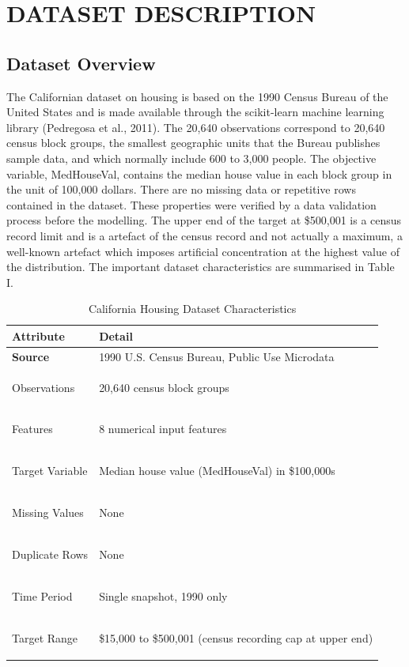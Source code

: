 \documentclass[pdflatex,sn-mathphys-num]{sn-jnl}
\begin{document}
\section{DATASET DESCRIPTION}
\subsection{Dataset Overview}
The Californian dataset on housing is based on the 1990 Census Bureau of the United States and is made available through the scikit-learn machine learning library (Pedregosa et al., 2011). The 20,640 observations correspond to 20,640 census block groups, the smallest geographic units that the Bureau publishes sample data, and which normally include 600 to 3,000 people. The objective variable, MedHouseVal, contains the median house value in each block group in the unit of 100,000 dollars. There are no missing data or repetitive rows contained in the dataset. These properties were verified by a data validation process before the modelling. The upper end of the target at \$500,001 is a census record limit and is a artefact of the census record and not actually a maximum, a well-known artefact which imposes artificial concentration at the highest value of the distribution. The important dataset characteristics are summarised in Table I.

\begin{table}[h!]
\centering
\renewcommand{\arraystretch}{1.3}
\setlength{\tabcolsep}{10pt}

\caption{California Housing Dataset Characteristics}
\begin{tabular}{|>{\bfseries}l|l|}
\hline
\rowcolor[HTML]{2F4F7F}
\color{white} Attribute & \color{white} Detail \\ \hline

\rowcolor[HTML]{E6E6E6}
Source & 1990 U.S. Census Bureau, Public Use Microdata \\ \hline

Observations & 20,640 census block groups \\ \hline

\rowcolor[HTML]{E6E6E6}
Features & 8 numerical input features \\ \hline

Target Variable & Median house value (MedHouseVal) in \$100,000s \\ \hline

\rowcolor[HTML]{E6E6E6}
Missing Values & None \\ \hline

Duplicate Rows & None \\ \hline

\rowcolor[HTML]{E6E6E6}
Time Period & Single snapshot, 1990 only \\ \hline

Target Range & \$15,000 to \$500,001 (census recording cap at upper end) \\ \hline

\end{tabular}
\end{table}
\end{document}
